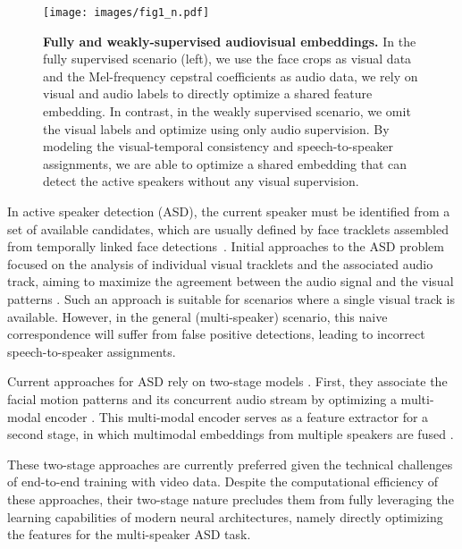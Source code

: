 \documentclass[10pt,twocolumn,letterpaper]{article}
\begin{document}
\label{sec:intro}
 \begin{figure*}[t]
    \begin{center}
        \texttt{[image: images/fig1\_n.pdf]}        
    \end{center}
    \caption{
        \textbf{Fully and weakly-supervised audiovisual embeddings.} In the fully supervised scenario (left), we use the face crops as visual data and the Mel-frequency cepstral coefficients as audio data, we rely on visual and audio labels to directly optimize a shared feature embedding. In contrast, in the weakly supervised scenario, we omit the visual labels and optimize using only audio supervision. By modeling the visual-temporal consistency and speech-to-speaker assignments, we are able to optimize a shared embedding that can detect the active speakers without any visual supervision.
    }
    \label{fig:firstfig}
\end{figure*} In active speaker detection (ASD), the current speaker must be identified from a set of available candidates, which are usually defined by face tracklets assembled from temporally linked face detections~\cite{roth2020ava,chakravarty2016active,leon2021maas}. Initial approaches to the ASD problem focused on the analysis of individual visual tracklets and the associated audio track, aiming to maximize the agreement between the audio signal and the visual patterns \cite{roth2020ava,chung2019naver,zhangmulti}. Such an approach is suitable for scenarios where a single visual track is available. However, in the general (multi-speaker) scenario, this naive correspondence will suffer from false positive detections, leading to incorrect speech-to-speaker assignments.

Current approaches for ASD rely on two-stage models \cite{leon2021maas,kopuklu2021design,tao2021someone}. First, they associate the facial motion patterns and its concurrent audio stream by optimizing a multi-modal encoder \cite{roth2020ava}. This multi-modal encoder serves as a feature extractor for a second stage, in which multimodal embeddings from multiple speakers are fused \cite{alcazar2020active}. 

These two-stage approaches are currently preferred given the technical challenges of end-to-end training with video data. Despite the computational efficiency of these approaches, their two-stage nature precludes them from 
fully leveraging the learning capabilities of modern neural architectures, namely directly optimizing the features for the multi-speaker ASD task. 
\end{document}

